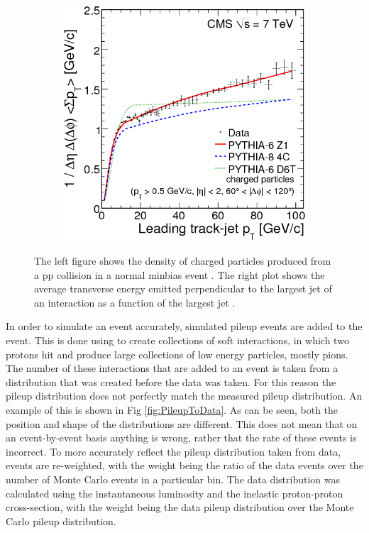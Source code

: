 \begin{figure}
\begin{subfigure}[b]{1.\SideBySidePlotWidth}
        \includegraphics[width=\linewidth]{figures/Simulation/PtunderlyingEvent.png}
        \caption{}
    \end{subfigure}%
    \caption{The left figure shows the density of charged particles produced from a pp collision in a normal minbias event \cite{Chatrchyan:2014qka}. The right plot shows the average transverse energy emitted perpendicular to the largest jet of an interaction as a function of the largest jet \pt.\cite{Chatrchyan:2011id}}
    \label{fig:MinBiasFigures}
\end{figure}

In order to simulate an event accurately, simulated pileup events are added to the event. This is done using \PYTHIA to create collections of soft interactions, in which two protons hit and produce large collections of low energy particles, mostly pions. The number of these interactions that are added  to an event is taken from a distribution that was created before the data was taken. For this reason the pileup distribution does not perfectly match the measured pileup distribution. An example of this is shown in Fig \ref{fig:PileupToData}. As can be seen, both the position and shape of the distributions are different. This does not mean that on an event-by-event basis anything is wrong, rather that the rate of these events is incorrect. To more accurately reflect the pileup distribution taken from data, events are re-weighted, with the weight being the ratio of the data events over the number of Monte Carlo events in a particular bin. The data distribution was calculated using the instantaneous luminosity and the inelastic proton-proton cross-section, with the weight being the data pileup distribution over the Monte Carlo pileup distribution. 

